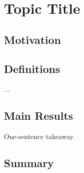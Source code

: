\section{Topic Title}
\label{sec:chapter:topic}

\subsection{Motivation}

\subsection{Definitions}

\begin{definition}[Name]
  ...
\end{definition}

\subsection{Main Results}

\begin{keyidea}
  One-sentence takeaway.
\end{keyidea}


\subsection{Summary}

